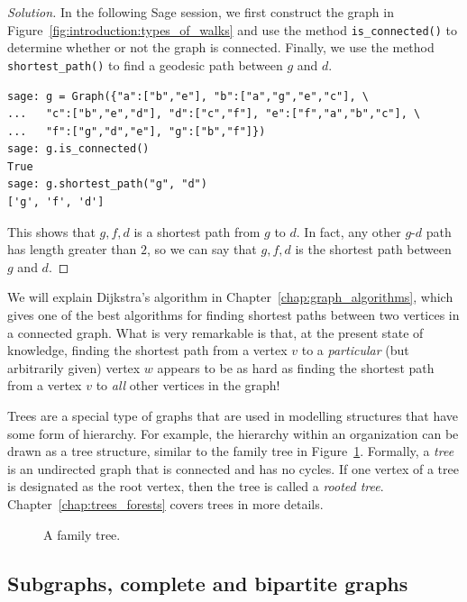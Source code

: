 \begin{proof}[Solution]
In the following Sage session, we first construct the graph in
Figure~\ref{fig:introduction:types_of_walks} and use the method
\verb!is_connected()! to determine whether or not the graph is
connected. Finally, we use the method \verb!shortest_path()! to find
a geodesic path between $g$ and $d$.
%
\begin{lstlisting}
sage: g = Graph({"a":["b","e"], "b":["a","g","e","c"], \
...   "c":["b","e","d"], "d":["c","f"], "e":["f","a","b","c"], \
...   "f":["g","d","e"], "g":["b","f"]})
sage: g.is_connected()
True
sage: g.shortest_path("g", "d")
['g', 'f', 'd']
\end{lstlisting}
%
This shows that $g, f, d$ is a shortest path from $g$ to $d$. In fact,
any other $g$-$d$ path has length greater than $2$, so we can say that
$g, f, d$ is the shortest path between $g$ and $d$.
\end{proof}

We will explain Dijkstra's algorithm in
Chapter~\ref{chap:graph_algorithms}, which gives one of the best
algorithms for finding shortest paths between two vertices in a
connected graph. What is very remarkable is that, at the present state
of knowledge, finding the shortest path from a vertex $v$ to a
\emph{particular} (but arbitrarily given) vertex $w$ appears to be as
hard as finding the shortest path from a vertex $v$ to \emph{all}
other vertices in the graph!
\index{Dijkstra's algorithm}

Trees are a special type of graphs that are used in modelling
structures that have some form of hierarchy. For example, the
hierarchy within an organization can be drawn as a tree
structure, similar to the family tree in
Figure~\ref{fig:introduction:family_tree}. Formally, a \emph{tree} is
an undirected graph that is connected and has no cycles. If one vertex
of a tree is designated as the root vertex, then the tree is called a
\emph{rooted tree}. Chapter~\ref{chap:trees_forests} covers trees in
more details.
\index{family tree}

\begin{figure}[!htbp]
\centering

\caption{A family tree.}
\label{fig:introduction:family_tree}
\end{figure}



\subsection{Subgraphs, complete and bipartite graphs}

